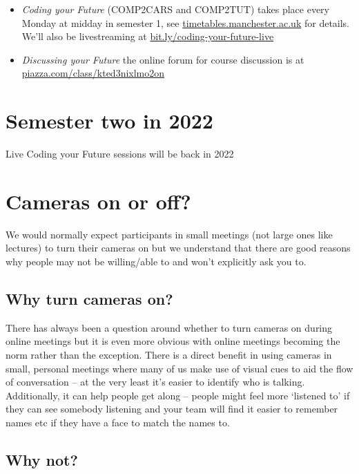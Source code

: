\documentclass[
]{book}
\providecommand{\tightlist}{%
  \setlength{\itemsep}{0pt}\setlength{\parskip}{0pt}}
\begin{document}
\begin{itemize}
\tightlist
\item
  \emph{Coding your Future} (COMP2CARS and COMP2TUT) takes place every Monday at midday in semester 1, see \href{https://timetables.manchester.ac.uk/}{timetables.manchester.ac.uk} for details. We'll also be livestreaming at \href{https://bit.ly/coding-your-future-live}{bit.ly/coding-your-future-live}
\item
  \emph{Discussing your Future} the online forum for course discussion is at \href{https://piazza.com/class/kted3nixlmo2on}{piazza.com/class/kted3nixlmo2on}
\end{itemize}

\hypertarget{semester-two-in-2022}{%
\section{Semester two in 2022}\label{semester-two-in-2022}}

Live Coding your Future sessions will be back in 2022

\hypertarget{cameras}{%
\section{Cameras on or off?}\label{cameras}}

We would normally expect participants in small meetings (not large ones like lectures) to turn their cameras on but we understand that there are good reasons why people may not be willing/able to and won't explicitly ask you to.

\hypertarget{why-turn-cameras-on}{%
\subsection{Why turn cameras on?}\label{why-turn-cameras-on}}

There has always been a question around whether to turn cameras on during online meetings but it is even more obvious with online meetings becoming the norm rather than the exception. There is a direct benefit in using cameras in small, personal meetings where many of us make use of visual cues to aid the flow of conversation -- at the very least it's easier to identify who is talking. Additionally, it can help people get along -- people might feel more `listened to' if they can see somebody listening and your team will find it easier to remember names etc if they have a face to match the names to.

\hypertarget{why-not}{%
\subsection{Why not?}\label{why-not}}
\end{document}
